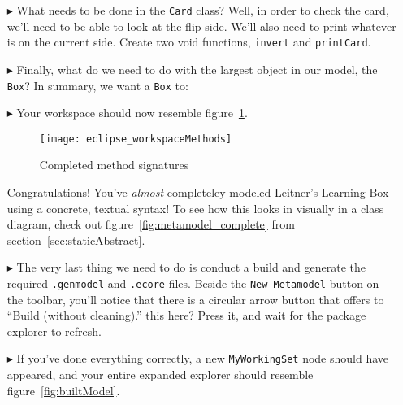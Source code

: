 \begin{itemize}
\item[$\blacktriangleright$] What needs to be done in the \texttt{Card} class? Well, in order to check the card, we'll need to be able to look at the flip side.
We'll also need to print whatever is on the current side. Create two void functions, \texttt{invert} and \texttt{printCard}.

\vfill
\pagebreak

\item[$\blacktriangleright$] Finally, what do we need to do with the largest object in our model, the \texttt{Box}? In summary, we want a \texttt{Box} to:



\item[$\blacktriangleright$] Your workspace should now resemble figure~\ref{fig:workspaceMethods}.
\begin{figure}[htbp]
	\centering
  \texttt{[image: eclipse\_workspaceMethods]}
	\caption{Completed method signatures}
	\label{fig:workspaceMethods}
\end{figure}


Congratulations! You've \emph{almost} completeley modeled Leitner's Learning Box using a concrete, textual syntax! To see how this looks in visually in a class
diagram, check out figure~\ref{fig:metamodel_complete} from section~\ref{sec:staticAbstract}.

\item[$\blacktriangleright$]The very last thing we need to do is conduct a build and generate the required \texttt{.genmodel} and \texttt{.ecore} files. Beside
the \texttt{New Metamodel} button on the toolbar, you'll notice that there is a circular arrow button that offers to ``Build (without cleaning).''   %
this here? Press it, and wait for the package explorer to refresh.

\item[$\blacktriangleright$] If you've done everything correctly, a new \texttt{MyWorkingSet} node should have appeared, and your entire expanded explorer
should resemble figure~\ref{fig:builtModel}.


\end{itemize}
